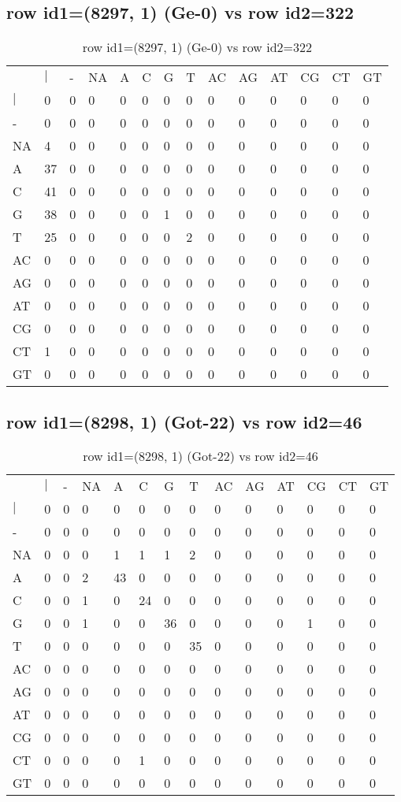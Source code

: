 \subsection{row id1=(8297, 1) (Ge-0) vs row id2=322}
\begin{center}
\begin{longtable}{|l|l|l|l|l|l|l|l|l|l|l|l|l|l|}
\caption{row id1=(8297, 1) (Ge-0) vs row id2=322} \label{table_dm272}\\
\hline
\\
\hline
&$|$&-&NA&A&C&G&T&AC&AG&AT&CG&CT&GT\\
$|$&0&0&0&0&0&0&0&0&0&0&0&0&0\\
-&0&0&0&0&0&0&0&0&0&0&0&0&0\\
NA&4&0&0&0&0&0&0&0&0&0&0&0&0\\
A&37&0&0&0&0&0&0&0&0&0&0&0&0\\
C&41&0&0&0&0&0&0&0&0&0&0&0&0\\
G&38&0&0&0&0&1&0&0&0&0&0&0&0\\
T&25&0&0&0&0&0&2&0&0&0&0&0&0\\
AC&0&0&0&0&0&0&0&0&0&0&0&0&0\\
AG&0&0&0&0&0&0&0&0&0&0&0&0&0\\
AT&0&0&0&0&0&0&0&0&0&0&0&0&0\\
CG&0&0&0&0&0&0&0&0&0&0&0&0&0\\
CT&1&0&0&0&0&0&0&0&0&0&0&0&0\\
GT&0&0&0&0&0&0&0&0&0&0&0&0&0\\
\hline
\end{longtable}
\end{center}

\subsection{row id1=(8298, 1) (Got-22) vs row id2=46}
\begin{center}
\begin{longtable}{|l|l|l|l|l|l|l|l|l|l|l|l|l|l|}
\caption{row id1=(8298, 1) (Got-22) vs row id2=46} \label{table_dm274}\\
\hline
\\
\hline
&$|$&-&NA&A&C&G&T&AC&AG&AT&CG&CT&GT\\
$|$&0&0&0&0&0&0&0&0&0&0&0&0&0\\
-&0&0&0&0&0&0&0&0&0&0&0&0&0\\
NA&0&0&0&1&1&1&2&0&0&0&0&0&0\\
A&0&0&2&43&0&0&0&0&0&0&0&0&0\\
C&0&0&1&0&24&0&0&0&0&0&0&0&0\\
G&0&0&1&0&0&36&0&0&0&0&1&0&0\\
T&0&0&0&0&0&0&35&0&0&0&0&0&0\\
AC&0&0&0&0&0&0&0&0&0&0&0&0&0\\
AG&0&0&0&0&0&0&0&0&0&0&0&0&0\\
AT&0&0&0&0&0&0&0&0&0&0&0&0&0\\
CG&0&0&0&0&0&0&0&0&0&0&0&0&0\\
CT&0&0&0&0&1&0&0&0&0&0&0&0&0\\
GT&0&0&0&0&0&0&0&0&0&0&0&0&0\\
\hline
\end{longtable}
\end{center}

